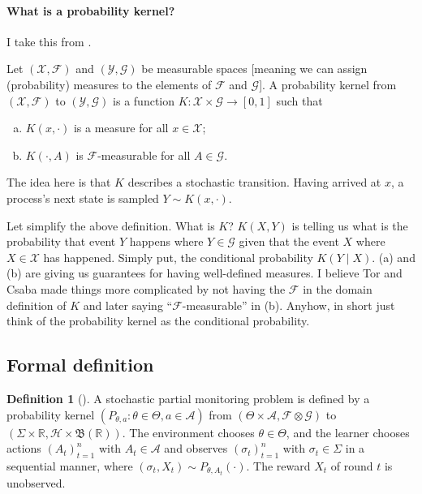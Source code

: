 \documentclass[a4paper]{article}
\theoremstyle{definition}
\newtheorem{definition}{Definition}
\newcommand{\cA}{\mathcal{A}}
\newcommand{\cF}{\mathcal{F}}
\newcommand{\cG}{\mathcal{G}}
\newcommand{\cH}{\mathcal{H}}
\newcommand{\cX}{\mathcal{X}}
\newcommand{\cY}{\mathcal{Y}}
\newcommand{\fB}{\mathfrak{B}}
\newcommand{\R}{\mathbb{R}}
\begin{document}
\paragraph{What is a probability kernel?} I take this from \citet[pp. 48]{lattimore2020bandit}.
    
Let $(\cX, \cF)$ and $(\cY, \cG)$ be measurable spaces [meaning we can assign (probability) measures to the elements of $\cF$ and $\cG$]. A probability kernel from $(\cX, \cF)$ to $(\cY, \cG)$ is a function $K: \cX \times \cG \to [0, 1]$ such that
%
\begin{enumerate}[(a)]
    \item $K(x, \cdot)$ is a measure for all $x \in \cX$; 
    \item $K(\cdot, A)$ is $\cF$-measurable for all $A \in \cG$.
\end{enumerate}
%
The idea here is that $K$ describes a stochastic transition. Having arrived at $x$, a process’s next state is sampled $Y \sim K(x, \cdot)$.

Let simplify the above definition. What is $K$? $K(X, Y)$ is telling us what is the probability that event $Y$ happens where $Y \in \cG$ given that the event $X$ where $X \in \cX$ has happened. Simply put, the conditional probability $K(Y \mid X)$. (a) and (b) are giving us guarantees for having well-defined measures. I believe Tor and Csaba made things more complicated by not having the $\cF$ in the domain definition of $K$ and later saying ``$\cF$-measurable'' in (b). Anyhow, in short just think of the probability kernel as the conditional probability.
    
%
%
%
\subsection{Formal definition}
\label{sec:pm_formal}
\begin{definition}[{\normalfont\citet[pp. 504]{lattimore2020bandit}}]
\label{def:pm_formal}
    A stochastic partial monitoring problem is defined by a probability kernel $(P_{\theta, a}: \theta \in \Theta, a \in \cA)$ from $(\Theta \times \cA, \cF \otimes \cG)$ to $(\Sigma \times \R, \cH \times \fB(\R))$. The environment chooses $\theta \in \Theta$, and the learner chooses actions $(A_t)_{t = 1}^{n}$ with $A_t \in \cA$ and observes $(\sigma_t)_{t = 1}^n$ with $\sigma_t \in \Sigma$ in a sequential manner, where $(\sigma_t, X_t) \sim P_{\theta, A_t}(\cdot)$. The reward $X_t$ of round $t$ is unobserved. 
\end{definition}
\end{document}
